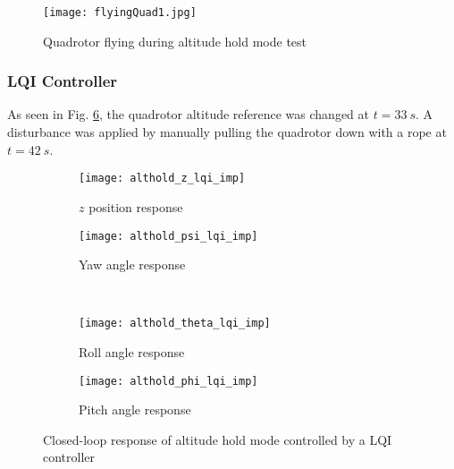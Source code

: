 \begin{figure}[h]
\begin{center}
\texttt{[image: flyingQuad1.jpg]}  
\caption{Quadrotor flying during altitude hold mode test} 
\label{fig:altholdquad}
\end{center}
\end{figure}

\subsubsection{LQI Controller}
As seen in Fig. \ref{fig:althold_lqi_imp}, the quadrotor altitude reference was changed at $t = 33\ s$. A disturbance was applied by manually pulling the quadrotor down with a rope at $t = 42\ s$.
\begin{figure}[H]
\begin{subfigure}{.5\linewidth}
\centering
\texttt{[image: althold\_z\_lqi\_imp]}
\caption{$z$ position response}
\label{fig:althold_z_lqi_imp}
\end{subfigure}%
\begin{subfigure}{.5\linewidth}
\centering
\texttt{[image: althold\_psi\_lqi\_imp]}
\caption{Yaw angle response}
\label{fig:althold_psi_lqi_imp}
\end{subfigure}\\[1ex]
\begin{subfigure}{0.5\linewidth}
\centering
\texttt{[image: althold\_theta\_lqi\_imp]}
\caption{Roll angle response}
\label{fig:althold_theta_lqi_imp}
\end{subfigure}
\begin{subfigure}{0.5\linewidth}
\centering
\texttt{[image: althold\_phi\_lqi\_imp]}
\caption{Pitch angle response}
\label{fig:althold_phi_lqi_imp}
\end{subfigure}
\caption{Closed-loop response of altitude hold mode controlled by a LQI controller}
\label{fig:althold_lqi_imp}
\end{figure}


